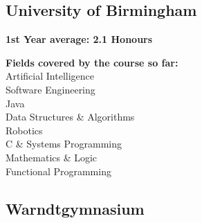\documentclass[]{jonas-cv}
\begin{document}
%
%
\lastupdated

%
%

%
%

\begin{minipage}[t]{0.34\textwidth} 



\subsection{University of Birmingham}
\sectionsep

\begin{tightemize}
    \item \textbf{1st Year average: 2.1 Honours}
    \item \textbf{Fields covered by the course so far:}\\
    Artificial Intelligence \\
    Software Engineering \\
    Java \\
    Data Structures \& Algorithms \\
    Robotics \\
    C \& Systems Programming \\
    Mathematics \& Logic \\
    Functional Programming
\end{tightemize}
\largesectionsep


\subsection{Warndtgymnasium}


\end{minipage}
\end{document}
